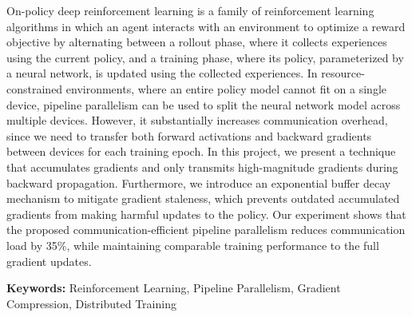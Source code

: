 On-policy deep reinforcement learning is a family of reinforcement learning algorithms in which an agent interacts with an environment to optimize a reward objective by alternating between a rollout phase, where it collects experiences using the current policy, and a training phase, where its policy, parameterized by a neural network, is updated using the collected experiences.
In resource-constrained environments, where an entire policy model cannot fit on a single device, pipeline parallelism can be used to split the neural network model across multiple devices. However, it substantially increases communication overhead, since we need to transfer both forward activations and backward gradients between devices for each training epoch.
In this project, we present a technique that accumulates gradients and only transmits high-magnitude gradients during backward propagation. Furthermore, we introduce an exponential buffer decay mechanism to mitigate gradient staleness, which prevents outdated accumulated gradients from making harmful updates to the policy.
Our experiment shows that the proposed communication-efficient pipeline parallelism reduces communication load by 35\%, while maintaining comparable training performance to the full gradient updates.

{\bf Keywords:} Reinforcement Learning, Pipeline Parallelism, Gradient Compression, Distributed Training




